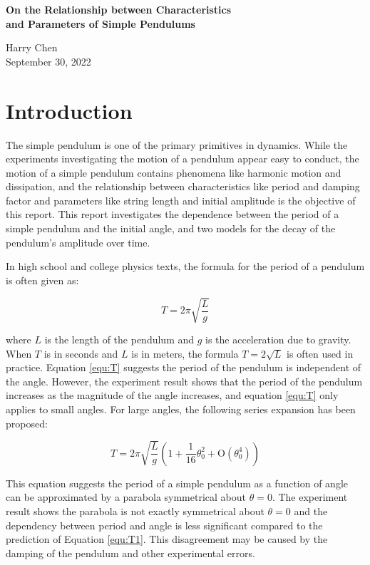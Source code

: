 \documentclass[12pt]{article}
\begin{document}
\begin{center}

\bf{\LARGE
On the Relationship between Characteristics \\ and Parameters of Simple Pendulums
}

\rm{\large
Harry Chen\\
September 30, 2022
}

\end{center}


\section{Introduction}

The simple pendulum is one of the primary primitives in dynamics. While the experiments investigating the motion of a pendulum appear easy to conduct, the motion of a simple pendulum contains phenomena like harmonic motion and dissipation, and the relationship between characteristics like period and damping factor and parameters like string length and initial amplitude is the objective of this report. This report investigates the dependence between the period of a simple pendulum and the initial angle, and two models for the decay of the pendulum's amplitude over time.

In high school and college physics texts, the formula for the period of a pendulum is often given as: ~\cite{openstax-physics}

\begin{equation}
\label{equ:T}
T=2\pi\sqrt{\frac{L}{g}}
\end{equation}

where $L$ is the length of the pendulum and $g$ is the acceleration due to gravity. When $T$ is in seconds and $L$ is in meters, the formula $T=2\sqrt{L}$ is often used in practice. Equation \ref{equ:T} suggests the period of the pendulum is independent of the angle. However, the experiment result shows that the period of the pendulum increases as the magnitude of the angle increases, and equation \ref{equ:T} only applies to small angles. For large angles, the following series expansion has been proposed: ~\cite{hyperphysics-pendl}

\begin{equation}
\label{equ:T1}
T=2\pi\sqrt{\frac{L}{g}}\left(1+\frac{1}{16}\theta_0^2+\mathrm{O}\left(\theta_0^4\right)\right)
\end{equation}

This equation suggests the period of a simple pendulum as a function of angle can be approximated by a parabola symmetrical about $\theta=0$. The experiment result shows the parabola is not exactly symmetrical about $\theta=0$ and the dependency between period and angle is less significant compared to the prediction of Equation \ref{equ:T1}. This disagreement may be caused by the damping of the pendulum and other experimental errors.
\end{document}
